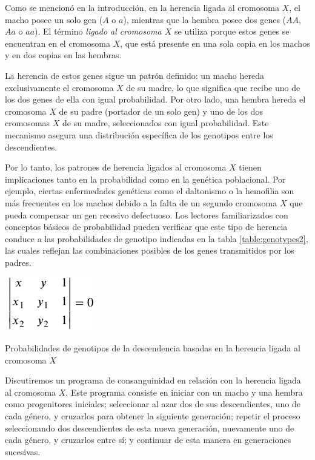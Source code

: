 Como se mencionó en la introducción, en la herencia ligada al cromosoma $X$, el macho posee un solo gen ($A$ o $a$), mientras que la hembra posee dos genes ($AA$, $Aa$ o $aa$). El término \textit{ligado al cromosoma $X$} se utiliza porque estos genes se encuentran en el cromosoma $X$, que está presente en una sola copia en los machos y en dos copias en las hembras.

La herencia de estos genes sigue un patrón definido: un macho hereda exclusivamente el cromosoma $X$ de su madre, lo que significa que recibe uno de los dos genes de ella con igual probabilidad. Por otro lado, una hembra hereda el cromosoma $X$ de su padre (portador de un solo gen) y uno de los dos cromosomas $X$ de su madre, seleccionados con igual probabilidad. Este mecanismo asegura una distribución específica de los genotipos entre los descendientes.

Por lo tanto, los patrones de herencia ligados al cromosoma $X$ tienen implicaciones tanto en la probabilidad como en la genética poblacional. Por ejemplo, ciertas enfermedades genéticas como el daltonismo o la hemofilia son más frecuentes en los machos debido a la falta de un segundo cromosoma $X$ que pueda compensar un gen recesivo defectuoso. Los lectores familiarizados con conceptos básicos de probabilidad pueden verificar que este tipo de herencia conduce a las probabilidades de genotipo indicadas en la tabla \ref{table:genotypes2}, las cuales reflejan las combinaciones posibles de los genes transmitidos por los padres.\newpage
\begin{table}[h!]
    \centering
    \hspace{-0.4cm}\includegraphics[page=96]{Externalizacion/C8/MatricesC8.pdf}
    \caption{Probabilidades de genotipos de la descendencia basadas en la herencia ligada al cromosoma $X$}
    \label{table:genotypes2}
\end{table}

Discutiremos un programa de consanguinidad en relación con la herencia ligada al cromosoma $X$. Este programa consiste en iniciar con un macho y una hembra como progenitores iniciales; seleccionar al azar dos de sus descendientes, uno de cada género, y cruzarlos para obtener la siguiente generación; repetir el proceso seleccionando dos descendientes de esta nueva generación, nuevamente uno de cada género, y cruzarlos entre sí; y continuar de esta manera en generaciones sucesivas.

